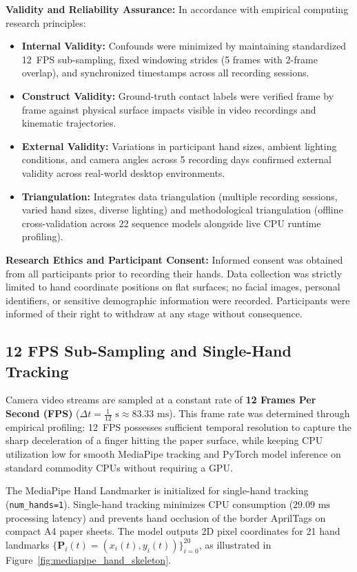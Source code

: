 \textbf{Validity and Reliability Assurance:} In accordance with empirical computing research principles:
\begin{itemize}
    \item \textbf{Internal Validity:} Confounds were minimized by maintaining standardized 12~FPS sub-sampling, fixed windowing strides (5 frames with 2-frame overlap), and synchronized timestamps across all recording sessions.
    \item \textbf{Construct Validity:} Ground-truth contact labels were verified frame by frame against physical surface impacts visible in video recordings and kinematic trajectories.
    \item \textbf{External Validity:} Variations in participant hand sizes, ambient lighting conditions, and camera angles across 5 recording days confirmed external validity across real-world desktop environments.
    \item \textbf{Triangulation:} Integrates data triangulation (multiple recording sessions, varied hand sizes, diverse lighting) and methodological triangulation (offline cross-validation across 22 sequence models alongside live CPU runtime profiling).
\end{itemize}

\textbf{Research Ethics and Participant Consent:} Informed consent was obtained from all participants prior to recording their hands. Data collection was strictly limited to hand coordinate positions on flat surfaces; no facial images, personal identifiers, or sensitive demographic information were recorded. Participants were informed of their right to withdraw at any stage without consequence.

\subsection{12 FPS Sub-Sampling and Single-Hand Tracking}
\label{subsec:meth_subsampling}
Camera video streams are sampled at a constant rate of \textbf{12 Frames Per Second (FPS)} ($\Delta t = \frac{1}{12}\text{ s} \approx 83.33\text{ ms}$). This frame rate was determined through empirical profiling: 12~FPS possesses sufficient temporal resolution to capture the sharp deceleration of a finger hitting the paper surface, while keeping CPU utilization low for smooth MediaPipe tracking and PyTorch model inference on standard commodity CPUs without requiring a GPU.

The MediaPipe Hand Landmarker is initialized for single-hand tracking (\texttt{num\_hands=1}). Single-hand tracking minimizes CPU consumption ($29.09\text{ ms}$ processing latency) and prevents hand occlusion of the border AprilTags on compact A4 paper sheets. The model outputs 2D pixel coordinates for 21 hand landmarks $\{\mathbf{P}_i(t) = (x_i(t), y_i(t))\}_{i=0}^{20}$, as illustrated in Figure~\ref{fig:mediapipe_hand_skeleton}.


